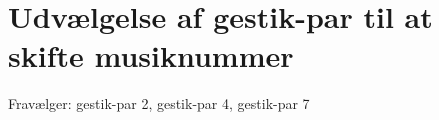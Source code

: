 \section{Udvælgelse af gestik-par til at skifte musiknummer}
\label{TestresultaterSkiftMusiknummer}
%


Fravælger: gestik-par 2, gestik-par 4, gestik-par 7